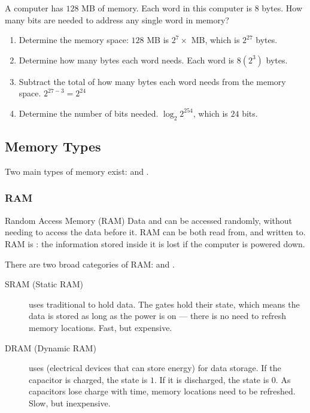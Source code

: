 \documentclass[../notes.tex]{subfiles}
\begin{document}
				\begin{example}
					A computer has $128$ MB of memory. Each word in this computer is $8$ bytes. How many bits are needed to address any single word in memory?
					\begin{enumerate}[nosep]
						\item Determine the memory space: $128$ MB is $2^{7} \times$ MB, which is $2^{27}$ bytes.
						\item Determine how many bytes each word needs. Each word is $8 (2^{3})$ bytes.
						\item Subtract the total of how many bytes each word needs from the memory space. $2^{27 - 3} = 2^{24}$
						\item Determine the number of bits needed. $\log_{2}2^{254}$, which is $24$ bits.
					\end{enumerate}
				\end{example}
			\subsection{Memory Types}
				Two main types of memory exist:  and .
				\subsubsection{RAM}
					\begin{definition}{Random Access Memory (RAM)}
						Data and can be accessed randomly, without needing to access the data before it. RAM can be both read from, and written to. RAM is : the information stored inside it is lost if the computer is powered down.
					\end{definition}
					There are two broad categories of RAM:  and .
					\begin{indentparagraph}
						\begin{description}
							\item[SRAM (Static RAM)] uses traditional  to hold data. The gates hold their state, which means the data is stored as long as the power is on --- there is no need to refresh memory locations. Fast, but expensive.
							\item[DRAM (Dynamic RAM)] uses  (electrical devices that can store energy) for data storage. If the capacitor is charged, the state is $1$. If it is discharged, the state is $0$. As capacitors lose charge with time, memory locations need to be refreshed. Slow, but inexpensive.
						\end{description}
					\end{indentparagraph}
\end{document}
